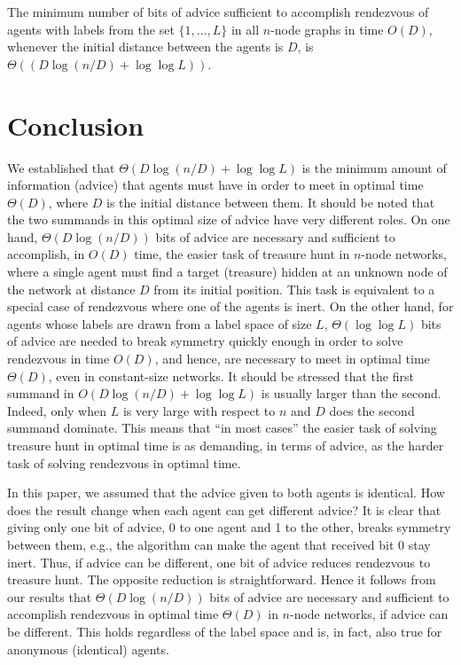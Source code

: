 \documentclass{llncs}
\begin{document}
\begin{corollary}
The minimum number of bits of advice sufficient to accomplish rendezvous of agents with labels from the set $\{1,\dots ,L\}$ in all $n$-node graphs in time $O(D)$, whenever the initial distance between the agents is $D$, is $\Theta((D\log (n/D)+\log\log L))$.
\end{corollary} 





\section{Conclusion}

We established that  $\Theta(D\log(n/D)+\log\log L)$ is the minimum amount of information (advice) that agents must have in order to meet in optimal time $\Theta(D)$, where $D$ is the initial distance between them.
It should be noted that the two summands in this optimal size of advice have very different roles. 
On one hand, $\Theta(D\log(n/D))$ bits of advice are necessary and sufficient
to accomplish, in $O(D)$ time, the easier task of treasure hunt in $n$-node networks, where a single agent must find a target (treasure) hidden at an unknown node of the network
at distance $D$ from its initial position. This task is equivalent to a special case of rendezvous where one of the agents is inert. On the other hand, for agents whose labels are drawn from a label space of size $L$,
$\Theta(\log\log L)$ bits of advice are needed to break symmetry quickly enough 
in order to solve rendezvous in time $O(D)$,  
and hence, are necessary to meet in optimal time $\Theta(D)$,  even in constant-size networks.
 It should be stressed that the first summand in $O(D\log(n/D)+\log\log L)$ is usually larger than the second. Indeed, only when $L$ is very large with respect to $n$ and $D$ does the second summand dominate. This means that  ``in most cases'' the easier task of solving treasure hunt in optimal time is as demanding,
 in terms of advice,  as the harder task of solving rendezvous in optimal time.
 
 In this paper, we assumed that the advice given to both agents is identical. How does the result change when each agent can get different advice? It is clear that
 giving only one bit of advice, 0 to one agent and 1 to the other, breaks symmetry between them, e.g., the algorithm can make the agent that received bit 0 stay inert. Thus, if advice can be different,
 one bit of advice reduces rendezvous to treasure hunt. The opposite reduction is straightforward. 
 Hence it follows from our results that $\Theta(D\log(n/D))$ bits of advice are necessary and sufficient
 to accomplish rendezvous in optimal time $\Theta(D)$ in $n$-node networks, if advice can be different. This holds regardless of the label space and is, in fact, 
 also true for anonymous (identical) agents.
 
\end{document}
